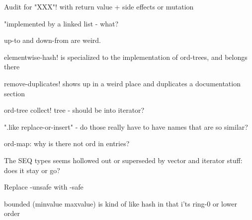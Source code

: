 \documentclass[12pt]{article}
\begin{document}
Audit for "XXX"! with return value + side effects or mutation

"implemented by a linked list - what?

up-to and down-from are weird.

elementwise-hash! is specialized to the implementation of ord-trees, and belongs there

remove-duplicates! shows up in a weird place and duplicates a documentation section

ord-tree collect! tree - should be into iterator?

".like replace-or-insert" - do those really have to have names that are so similar?

ord-map: why is there not ord in entries?

The SEQ types seems hollowed out or superseded by vector and iterator stuff: does it stay or go?

Replace -unsafe with -safe

bounded (minvalue maxvalue) is kind of like hash in that i'ts ring-0 or lower order
\end{document}
